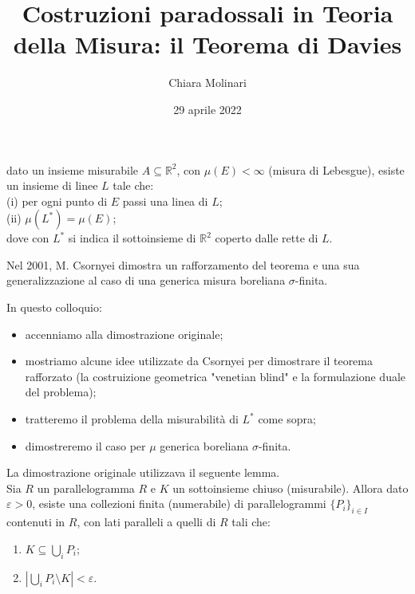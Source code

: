 \documentclass[11pt]{beamer} %
\author{Chiara Molinari}
\title{Costruzioni paradossali in Teoria della Misura: il Teorema di Davies}
\date{29 aprile 2022}
\newcommand{\R}{\mathbb{R}}
\newcommand{\<}{\langle}
\renewcommand{\>}{\rangle}
\theoremstyle{theorem}
\theoremstyle{theorem}
\theoremstyle{theorem}
\theoremstyle{theorem}
\theoremstyle{theorem}
\begin{document}

\begin{frame}
	\maketitle
\end{frame}


\begin{frame}[fragile]
	 dato un insieme misurabile $A \subseteq \R^2$, con $\mu(E)< \infty$ (misura di Lebesgue), esiste un insieme di linee $L$ tale che:\\
	(i) per ogni punto di $E$ passi una linea di $L$;\\
	(ii) $\mu(L^*)=\mu(E)$;\\
	dove con $L^*$ si indica il sottoinsieme di $\R^2$ coperto dalle rette di $L$.
	
	\medskip
	
	Nel 2001, M. Csornyei dimostra un rafforzamento del teorema e una sua generalizzazione al caso di una generica misura boreliana $\sigma$-finita. 
	
	\medskip
	 
	In questo colloquio:\\
	\begin{itemize}
		\item accenniamo alla dimostrazione originale;\\
		\item mostriamo alcune idee utilizzate da Csornyei per dimostrare il teorema rafforzato (la costruizione geometrica "venetian blind" e la formulazione duale del problema);\\
		\item tratteremo il problema della misurabilità di $L^*$ come sopra;\\
		\item dimostreremo il caso per $\mu$ generica boreliana $\sigma$-finita.
	\end{itemize}

\end{frame}
	
\begin{frame}
	
	
	La dimostrazione originale utilizzava il seguente lemma.\\
	
	Sia $R$ un parallelogramma $R$ e $K$ un sottoinsieme chiuso (misurabile). Allora dato $\varepsilon>0$, esiste una collezioni finita (numerabile) di parallelogrammi $\{P_i\}_{i \in I}$ contenuti in $R$, con lati paralleli a quelli di $R$ tali che:\\
	\begin{enumerate}[i]
		\item $K \subseteq \bigcup_i P_i$;	
		\item $|\bigcup_i P_i \setminus K|< \varepsilon$.
	\end{enumerate}
	

\end{frame}
\end{document}
